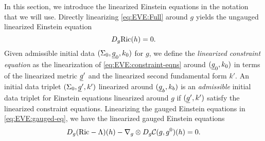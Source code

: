 \documentclass{article}
\begin{document}
In this section, we introduce the linearized Einstein equations in the
notation that we will use.  Directly linearizing \eqref{eq:EVE:Full}
around $g$ yields the ungauged linearized Einstein equation
\begin{equation}
  \label{eq:linearized-EVE-ungauged}
  D_g\text{Ric}(h) = 0. 
\end{equation}
Given admissible initial data $(\Sigma_0, \underline{g}_0, k_0)$ for $g$,
we define the \emph{linearized constraint equation} as the
linearization of \eqref{eq:EVE:constraint-eqns} around
$(\underline{g}_0, k_0)$ in terms of the linearized metric
$\underline{g}'$ and the linearized second fundamental form
$k'$. %
An initial data triplet $(\Sigma_0, \underline{g}', k')$ linearized
around $(\underline{g}_b, k_b)$ is an \textit{admissible} initial
data triplet for Einstein equations linearized around $g$ if
$(\underline{g}', k')$ satisfy the linearized constraint equations.
Linearizing the gauged Einstein equations in \eqref{eq:EVE:gauged-eq},
we have the linearized gauged Einstein equations
\begin{equation}
  \label{eq:linearized-gauged-EVE}
  D_{g}(\text{Ric} - \Lambda)({h}) - \nabla_{g}\otimes D_{g}\mathcal{C}(g, g^0)(h) = 0. 
\end{equation}
\end{document}
